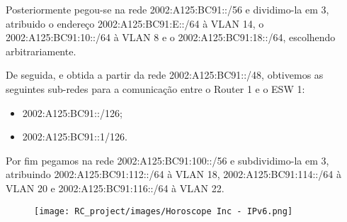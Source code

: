 \documentclass{report}
\begin{document}
Posteriormente pegou-se na rede 2002:A125:BC91::/56 e dividimo-la em 3, atribuido o endereço 2002:A125:BC91:E::/64 à VLAN 14, o 2002:A125:BC91:10::/64 à VLAN 8 e o 2002:A125:BC91:18::/64, escolhendo arbitrariamente.

De seguida, e obtida a partir da rede 2002:A125:BC91::/48, obtivemos as seguintes sub-redes para a comunicação entre o Router 1 e o ESW 1:
\begin{itemize}
    \item 2002:A125:BC91::/126;
    \item 2002:A125:BC91::1/126.
\end{itemize}

Por fim pegamos na rede 2002:A125:BC91:100::/56 e subdividimo-la em 3, atribuindo 2002:A125:BC91:112::/64 à VLAN 18, 2002:A125:BC91:114::/64 à VLAN 20 e 2002:A125:BC91:116::/64 à VLAN 22.

\newpage
\begin{figure}[H]
    \hspace*{-4.0cm}
    \centering
    \texttt{[image: RC\_project/images/Horoscope Inc - IPv6.png]}
\end{figure}

\newpage
\clearpage
\end{document}
